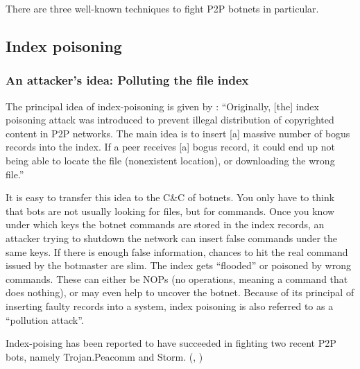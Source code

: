 \documentclass{llncs}
\begin{document}
There are three well-known techniques to fight P2P botnets in
particular.

\subsection{Index poisoning}
\label{indexpoisoning}
\subsubsection{An attacker's idea: Polluting the file index}
The principal idea of index-poisoning is given by
\cite{wang2009systematic}: ``Originally, [the] index poisoning attack was
introduced to prevent illegal distribution of copyrighted content in
P2P networks. The main idea is to insert [a] massive number of bogus
records into the index. If a peer receives [a] bogus record, it could end
up not being able to locate the file (nonexistent location), or
downloading the wrong file.''

It is easy to transfer this idea to the C\&C of botnets. You only have
to think that bots are not usually looking for files, but for
commands. Once you know under which keys the botnet commands are
stored in the index records, an attacker trying to shutdown the
network can insert false commands under the same keys. If there is
enough false information, chances to hit the real command issued by
the botmaster are slim. The index gets ``flooded'' or poisoned by wrong
commands. These can either be NOPs (no operations, meaning a command
that does nothing), or may even help to uncover the botnet. Because
of its principal of inserting faulty records into a system, index
poisoning is also referred to as a ``pollution
attack''\cite{liang2006index}.

Index-poising has been reported to have succeeded
in fighting two recent P2P bots, namely Trojan.Peacomm and
Storm. (\cite{grizzard2007peer}, \cite{liang2006index})
\end{document}
